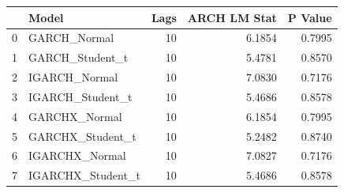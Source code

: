 \begin{table}[htbp]
\centering
\begin{tabular}{llrrr}
\toprule
 & Model & Lags & ARCH LM Stat & P Value \\
\midrule
0 & GARCH_Normal & 10 & 6.1854 & 0.7995 \\
1 & GARCH_Student_t & 10 & 5.4781 & 0.8570 \\
2 & IGARCH_Normal & 10 & 7.0830 & 0.7176 \\
3 & IGARCH_Student_t & 10 & 5.4686 & 0.8578 \\
4 & GARCHX_Normal & 10 & 6.1854 & 0.7995 \\
5 & GARCHX_Student_t & 10 & 5.2482 & 0.8740 \\
6 & IGARCHX_Normal & 10 & 7.0827 & 0.7176 \\
7 & IGARCHX_Student_t & 10 & 5.4686 & 0.8578 \\
\bottomrule
\end{tabular}
\label{tab:arch_lm}
\end{table}
